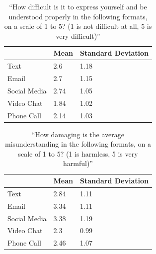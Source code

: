 \documentclass[acmsmall,screen,authorversion,nonacm]{acmart}
\newcommand{\QUOTE}[1]{\textsf{\textit{\textcolor{black}{``#1''}}}}
\begin{document}
\begin{table}[]
\begin{tabular}{|l|l|l|}
 \hline           
             & \textbf{Mean} & \textbf{Standard Deviation} \\ \hline
Text         & 2.6  & 1.18               \\\hline
Email        & 2.7  & 1.15               \\\hline
Social Media & 2.74 & 1.05               \\\hline
Video Chat   & 1.84 & 1.02               \\\hline
Phone Call   & 2.14 & 1.03               \\\hline            
\end{tabular}
\caption{\label{tab:difficulty_of_expression} ``How difficult is it to express yourself and be understood properly in the following formats, on a scale of 1 to 5? (1 is not difficult at all, 5 is very difficult)''}
\end{table}


\begin{table}[]
\begin{tabular}{|l|l|l|}
 \hline           
             & \textbf{Mean} & \textbf{Standard Deviation} \\ \hline
Text         & 2.84  & 1.11               \\\hline
Email        & 3.34  & 1.11               \\\hline
Social Media & 3.38 & 1.19               \\\hline
Video Chat   & 2.3 & 0.99               \\\hline
Phone Call   & 2.46 & 1.07               \\\hline            
\end{tabular}
\caption{\label{tab:damage_misunderstanding} ``How damaging is the average misunderstanding in the following formats, on a scale of 1 to 5? (1 is harmless, 5 is very harmful)''}
\end{table}

\end{document}
